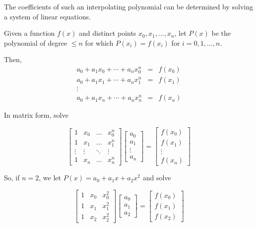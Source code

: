 \documentclass [titlepage,12pt,letter] {article}
\begin{document}
The coefficients of such an interpolating polynomial can be determined by solving a system of linear equations.

Given a function $f(x)$ and distinct points $x_0, x_1, ..., x_n$, let $P(x)$ be the polynomial of degree $\leq n$ for which $P(x_i) = f(x_i)$ for $i=0,1,...,n$.

Then,
\begin{eqnarray*}
a_0 + a_1x_0 + \dotsb + a_nx_0^n &=& f(x_0) \\
a_0 + a_1x_1 + \dotsb + a_nx_1^n &=& f(x_1) \\
\vdots \\
a_0 + a_1x_n + \dotsb + a_nx_n^n &=& f(x_n)
\end{eqnarray*}

In matrix form, solve

\[
\begin{bmatrix}
    1       & x_0 & \dots & x_0^n \\
   1       & x_1 & \dots & x_1^n \\
    \vdots & \vdots & \ddots & \vdots \\
   1       & x_n & \dots & x_n^n
\end{bmatrix}
\begin{bmatrix}
    a_0 \\
    a_1  \\
    \vdots \\
    a_n 
\end{bmatrix}
=
\begin{bmatrix}
   f(x_0) \\
  f(x_1)  \\
    \vdots \\
    f(x_n) 
\end{bmatrix}
\]

So, if $n=2$, we let $P(x) = a_0 + a_1x + a_2x^2$ and solve

\[
\begin{bmatrix}
    1       & x_0 &  x_0^2 \\
   1       & x_1 &  x_1^2 \\
   1       & x_2 &  x_2^2
\end{bmatrix}
\begin{bmatrix}
    a_0 \\
    a_1  \\
    a_2 
\end{bmatrix}
=
\begin{bmatrix}
   f(x_0) \\
  f(x_1)  \\
    f(x_2) 
\end{bmatrix}
\]
\end{document}
